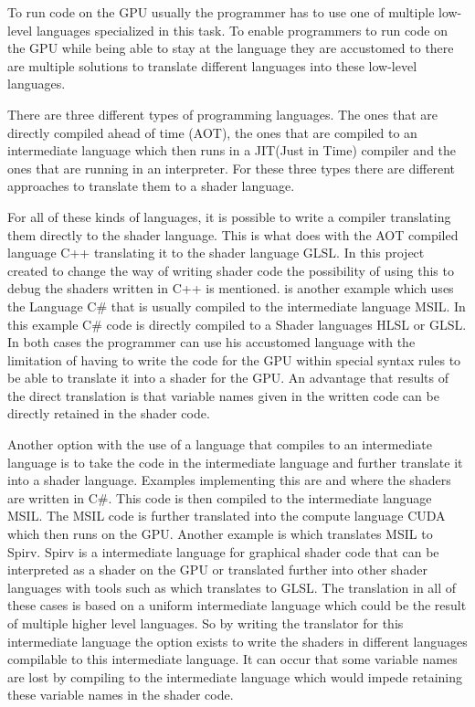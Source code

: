 To run code on the GPU usually the programmer has to use one of  multiple low-level languages specialized in this task. To enable programmers to run code on the GPU while being able to stay at the language they are accustomed to there are multiple solutions to translate different languages into these low-level languages.

There are three different types of programming languages. The ones that are directly compiled ahead of time (AOT), the ones that are compiled to an intermediate language which then runs in a JIT(Just in Time) compiler and the ones that are running in an interpreter. For these three types there are different approaches to translate them to a shader language.

For all of these kinds of languages, it is possible to write a compiler translating them directly to the shader language. This is what  does with the AOT compiled language C++ translating it to the shader language GLSL. In this project created to change the way of writing shader code the possibility of using this to debug the shaders written in C++ is mentioned.  is another example which uses the Language C\# that is usually compiled to the intermediate language MSIL. In this example C\# code is directly compiled to a Shader languages HLSL or GLSL. In both cases the programmer can use his accustomed language with the limitation of having to write the code for the GPU within special syntax rules to be able to translate it into a shader for the GPU. An advantage that results of the direct translation is that variable names given in the written code can be directly retained in the shader code.

Another option with the use of a language that compiles to an intermediate language is to take the code in the intermediate language and further translate it into a shader language. Examples implementing this are  and  where the shaders are written in C\#. This code is then compiled to the intermediate language MSIL. The MSIL code is further translated into the compute language CUDA which then runs on the GPU. Another example is  which translates MSIL to Spirv. Spirv is a intermediate language for graphical shader code that can be interpreted as a shader on the GPU or translated further into other shader languages with tools such as  which translates to GLSL. The translation in all of these cases is based on a uniform intermediate language which could be the result of multiple higher level languages. So by writing the translator for this intermediate language the option exists to write the shaders in different languages compilable to this intermediate language. It can occur that some variable names are lost by compiling to the intermediate language which would impede retaining these variable names in the shader code. 

